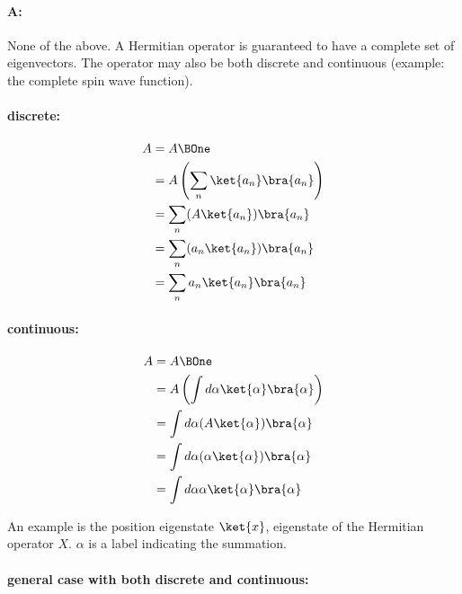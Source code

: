 \paragraph{A:} None of the above.  A Hermitian operator is guaranteed to have a complete set of eigenvectors.  The operator may also be both discrete and continuous (example: the complete spin wave function).

\paragraph{discrete:}

\begin{equation}\label{eqn:lecture8makingSenseOfQM:1020}
\begin{aligned}
A &= A \BOne \\
&= A \left( \sum_n \ket{a_n} \bra{a_n} \right) \\
&= \sum_n (A \ket{a_n} )\bra{a_n} \\
&= \sum_n (a_n \ket{a_n}) \bra{a_n} \\
&= \sum_n a_n \ket{a_n} \bra{a_n}
\end{aligned}
\end{equation}

\paragraph{continuous:}

\begin{equation}\label{eqn:lecture8makingSenseOfQM:1040}
\begin{aligned}
A &= A \BOne \\
&= A \left( \int d\alpha \ket{\alpha} \bra{\alpha} \right) \\
&= \int d\alpha (A \ket{\alpha} )\bra{\alpha} \\
&= \int d\alpha (\alpha \ket{\alpha}) \bra{\alpha} \\
&= \int d\alpha \alpha \ket{\alpha} \bra{\alpha}
\end{aligned}
\end{equation}

An example is the position eigenstate $\ket{x}$, eigenstate of the Hermitian operator $X$.  $\alpha$ is a label indicating the summation.

\paragraph{general case with both discrete and continuous:}

